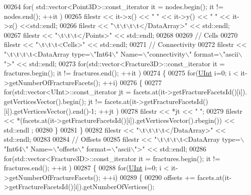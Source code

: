 \begin{DoxyCode}
00264     \textcolor{keywordflow}{for}( std::vector<Point3D>::const\_iterator it = nodes.begin(); it != nodes.end(); ++it )
00265         filestr << it->x() << \textcolor{stringliteral}{" "} << it->y() << \textcolor{stringliteral}{" "} << it->z() <<std::endl;
00266     filestr << \textcolor{stringliteral}{"\(\backslash\)t\(\backslash\)t\(\backslash\)t\(\backslash\)t</DataArray>"} << std::endl;
00267     filestr << \textcolor{stringliteral}{"\(\backslash\)t\(\backslash\)t\(\backslash\)t</Points>"} << std::endl;
00268 
00269     \textcolor{comment}{// Cells}
00270     filestr << \textcolor{stringliteral}{"\(\backslash\)t\(\backslash\)t\(\backslash\)t<Cells>"} << std::endl;
00271     \textcolor{comment}{//  Connectivity}
00272     filestr << \textcolor{stringliteral}{"\(\backslash\)t\(\backslash\)t\(\backslash\)t\(\backslash\)t<DataArray type=\(\backslash\)"Int64\(\backslash\)" Name=\(\backslash\)"connectivity\(\backslash\)" format=\(\backslash\)"ascii\(\backslash\)">"} << std::endl;
00273     \textcolor{keywordflow}{for}(std::vector<Fracture3D>::const\_iterator it = fractures.begin(); it != fractures.end(); ++it )
00274     \{
00275         \textcolor{keywordflow}{for}(\hyperlink{namespaceFVCode3D_a4bf7e328c75d0fd504050d040ebe9eda}{UInt} i=0; i < it->getNumberOfFractureFacets(); ++i)
00276         \{
00277             \textcolor{keywordflow}{for}(std::vector<UInt>::const\_iterator jt = facets.at(it->getFractureFacetsId()[i]).
      getVerticesVector().begin(); jt != facets.at(it->getFractureFacetsId()[i]).getVerticesVector().end()-1; ++jt )
00278                 filestr << *jt << \textcolor{stringliteral}{" "};
00279             filestr << *(facets.at(it->getFractureFacetsId()[i]).getVerticesVector().rbegin()) << std::endl
      ;
00280         \}
00281     \}
00282     filestr << \textcolor{stringliteral}{"\(\backslash\)t\(\backslash\)t\(\backslash\)t\(\backslash\)t</DataArray>"} << std::endl;
00283 
00284     \textcolor{comment}{//  Offsets}
00285     filestr << \textcolor{stringliteral}{"\(\backslash\)t\(\backslash\)t\(\backslash\)t\(\backslash\)t<DataArray type=\(\backslash\)"Int64\(\backslash\)" Name=\(\backslash\)"offsets\(\backslash\)" format=\(\backslash\)"ascii\(\backslash\)">"} << std::endl;
00286     \textcolor{keywordflow}{for}(std::vector<Fracture3D>::const\_iterator it = fractures.begin(); it != fractures.end(); ++it )
00287     \{
00288         \textcolor{keywordflow}{for}(\hyperlink{namespaceFVCode3D_a4bf7e328c75d0fd504050d040ebe9eda}{UInt} i=0; i < it->getNumberOfFractureFacets(); ++i)
00289         \{
00290             offsets += facets.at(it->getFractureFacetsId()[i]).getNumberOfVertices();

\end{DoxyCode}
